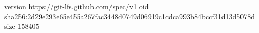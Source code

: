 version https://git-lfs.github.com/spec/v1
oid sha256:2d29e293e65e455a267fac3448d0749d06919c1cdca993b84bccf31d13d5078d
size 158405
